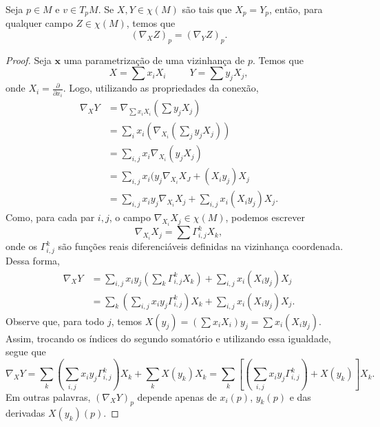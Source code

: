 \begin{lemma}
    \label{loc:lema_:_conexão_afim_é_uma_propriedade_local.}
    Seja $p \in M$ e $v \in T_{p}M$. Se $X, Y \in \chi(M)$ são tais que $X_{p}=Y_{p}$, então, para qualquer campo $Z \in \chi(M)$, temos que
    \begin{equation*}
        (\nabla_{X}Z)_{p}=(\nabla _{Y}Z)_{p}.
    \end{equation*}
    \begin{proof}

        Seja $\mathbf{x}$ uma parametrização de uma vizinhança de $p$. Temos que
        \begin{equation*}
            X=\sum x_i X_{i} \ \ \ \ \ \ \ \ \ \ \ Y=\sum y_{j}X_{j},
        \end{equation*}
        onde $X_{i}=\frac{\partial}{\partial x_{i}}$.
        Logo, utilizando as propriedades da conexão,
        \begin{align*}
            \nabla_{X}Y & = \nabla_{\sum x_{i}X_{i}}\left( \sum y_{j}X_{j} \right)                       \\
                        & =\sum_{i} x_{i}\left( \nabla_{X_{i}}\left( \sum_{j} y_{j}X_{j} \right) \right) \\
                        & =\sum_{i,j}x_{i}\nabla_{X_{i}}(y_{j}X_{j})                                     \\
                        & =\sum_{i,j}x_{i}(y_{j}\nabla_{X_{i}}X_{J}+(X_{i}y_{j})X_{j}                    \\
                        & = \sum_{i,j}x_{i}y_{j}\nabla_{X_{i}}X_{j}+\sum_{i,j}x_{i}(X_{i}y_{j})X_{j}.
        \end{align*}
        Como, para cada par $i, j$, o campo $\nabla_{X_{i}}X_{j}\in \chi(M)$, podemos escrever
        \begin{equation*}
            \nabla_{X_{i}}X_{j}=\sum \Gamma_{i,j}^{k}X_{k},
        \end{equation*}
        onde os $\Gamma_{i,j}^{k}$ são funções reais diferenciáveis definidas na vizinhança coordenada.
        Dessa forma,
        \begin{align*}
            \nabla_{X}Y & = \sum_{i,j} x_{i}y_{j}\left( \sum_{k}\Gamma_{i,j}^{k}X_{k}\right)+\sum_{i,j}x_{i}(X_{i}y_{j})X_{j}   \\
                        & =\sum_{k}\left( \sum_{i,j}x_{i}y_{j}\Gamma_{i,j}^{k} \right)X_{k} + \sum_{i,j}x_{i}(X_{i}y_{j})X_{j}.
        \end{align*}
        Observe que, para todo $j$, temos $X(y_{j})=\left( \sum x_{i}X_{i} \right)y_{j}=\sum x_{i}(X_{i}y_{j})$. Assim, trocando os índices do segundo somatório e utilizando essa igualdade, segue que
        \begin{equation*}
            \nabla_{X}Y=\sum_{k}\left( \sum_{i,j}x_{i}y_{j}\Gamma_{i,j}^{k} \right)X_{k} + \sum_{k}X(y_{k})X_{k}= \sum_{k}\left[\left( \sum_{i,j}x_{i}y_{j}\Gamma_{i,j}^{k} \right)+X(y_{k})\right]X_{k}.
        \end{equation*}
        Em outras palavras, $(\nabla_{X}Y)_{p}$ depende apenas de $x_{i}(p)$, $y_{k}(p)$ e das derivadas $X(y_{k})(p)$.


\end{proof}
\end{lemma}

